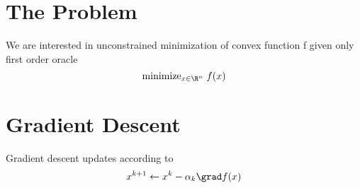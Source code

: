 \documentclass[11pt]{article}
\begin{document}
 

\section{The Problem}

We are interested in unconstrained minimization of convex function f given only first order oracle
\[
    \text{minimize}_{x\in\R^n}\; f(x)
\]

\section{Gradient Descent}

Gradient descent updates according to 
\begin{align*}
    x^{k+1} \leftarrow x^k - \alpha_k \grad f(x)    
\end{align*}



\end{document}
